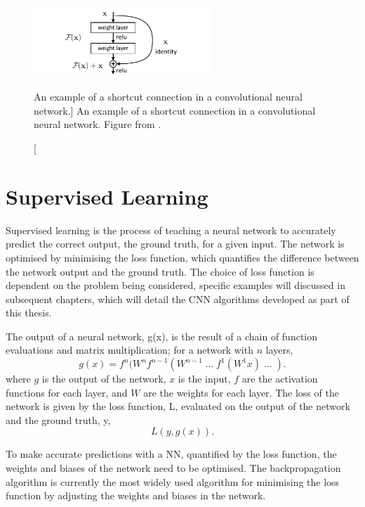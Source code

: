\begin{figure}

	\centering

	\includegraphics[width = 0.6\textwidth]{figures/short_connect.pdf}

	\caption
	[An example of a shortcut connection in a convolutional neural network.]
	{ An example of a shortcut connection in a convolutional neural network.
	Figure from \cite{He_2016_CVPR}.}

	\label{fig:short_connect}

\end{figure}

\section{Supervised Learning}
Supervised learning is the process of teaching a neural network to accurately
predict the correct output, the ground truth, for a given input. The network is 
optimised by minimising the loss function, which quantifies the difference 
between the network output and the ground truth. The choice of loss function 
is dependent on the problem being considered, specific examples will discussed 
in subsequent chapters, which will detail the CNN algorithms developed as part 
of this thesis.

The output of a neural network, g(x), is the result of a chain of function 
evaluations and matrix multiplication; for a network with $n$ layers,
\begin{equation*}
	g(x) = f^n(W^n f^{n-1}(W^{n-1} \;...\; f^1(W^1 x) \;...\; ).
\end{equation*}
where $g$ is the output of the network, $x$ is the input, $f$ are the 
activation functions for each layer, and $W$ are the weights for each layer. 
The loss of the network is given by the loss function, L,  evaluated on the 
output of the network and the ground truth, y,
\begin{equation*}
	L(y, g(x)).
\end{equation*}

To make accurate predictions with a NN, quantified by the loss function, the
weights and biases of the network need to be optimised. The backpropagation
algorithm\cite{Rumelhart1986} is currently the most widely used algorithm for
minimising the loss function by adjusting the weights and biases in the network.

